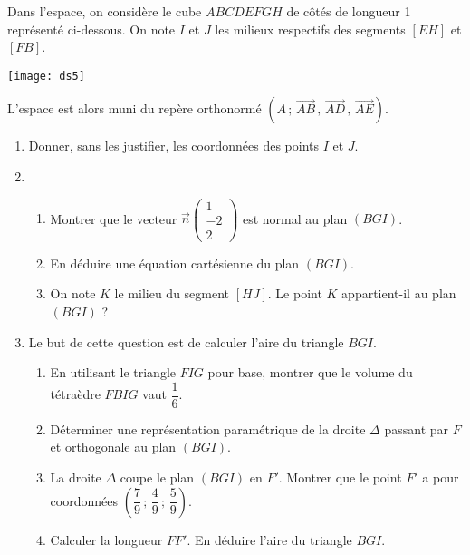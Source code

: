 \documentclass[11pt,fleqn, openany]{book} %
\begin{document}
%

    
 

\begin{exercise}[topic=geom16]Dans l'espace, on considère le cube $ABCDEFGH$ de côtés de longueur 1 représenté ci-dessous.
On note $I$ et $J$ les milieux respectifs des segments $[EH]$ et $[FB]$.

\begin{center}
\texttt{[image: ds5]}
\end{center}

L'espace est alors muni du repère orthonormé $(A\, ;\, \overrightarrow{AB}\, , \, \overrightarrow{AD} \, , \, \overrightarrow{AE})$.

\begin{enumerate}
\item Donner, sans les justifier, les coordonnées des points $I$ et $J$.
\vskip5pt
\item \begin{enumerate}
\item Montrer que le vecteur $\vec n \begin{pmatrix} 1 \\ -2 \\ 2 \end{pmatrix}$ est normal au plan $(BGI)$.
\item En déduire une équation cartésienne du plan $(BGI)$.
\item On note $K$ le milieu du segment $[HJ]$. Le point $K$ appartient-il au plan $(BGI)$ ?
\end{enumerate}
\item Le but de cette question est de calculer l'aire du triangle $BGI$.
\begin{enumerate}
\item En utilisant le triangle $FIG$ pour base, montrer que le volume du tétraèdre $FBIG$ vaut $\dfrac{1}{6}$.
\item Déterminer une représentation paramétrique de la droite $\Delta$ passant par $F$ et orthogonale au plan $(BGI)$.
\item La droite $\Delta$ coupe le plan $(BGI)$ en $F'$. Montrer que le point $F'$ a pour coordonnées $\left(\dfrac{7}{9} \, ;\, \dfrac{4}{9} \,;\, \dfrac{5}{9}\right)$.
\item Calculer la longueur $FF'$. En déduire l'aire du triangle $BGI$.
\end{enumerate} \end{enumerate}
\end{exercise}
\end{document}
